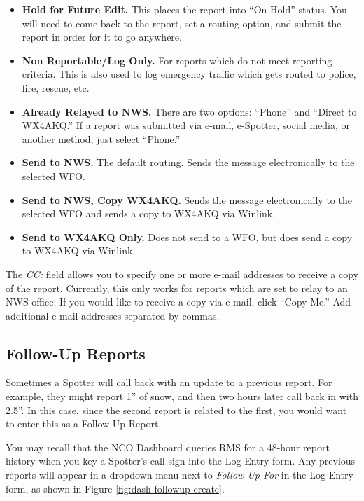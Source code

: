 \documentclass[pdflatex,letterpaper,twoside,12pt]{book}
\begin{document}
\begin{itemize}
\item \textbf{Hold for Future Edit.}  This places the report into ``On Hold'' status.  You will need to come back to the report, set a routing option, and submit the report in order for it to go anywhere.
\item \textbf{Non Reportable/Log Only.}  For reports which do not meet reporting criteria.  This is also used to log emergency traffic which gets routed to police, fire, rescue, etc.
\item \textbf{Already Relayed to NWS.}  There are two options:  ``Phone'' and ``Direct to WX4AKQ.''  If a report was submitted via e-mail, e-Spotter, social media, or another method, just select ``Phone.''
\item \textbf{Send to NWS.}  The default routing.  Sends the message electronically to the selected WFO.
\item \textbf{Send to NWS, Copy WX4AKQ.}  Sends the message electronically to the selected WFO and sends a copy to WX4AKQ via Winlink.
\item \textbf{Send to WX4AKQ Only.}  Does not send to a WFO, but does send a copy to WX4AKQ via Winlink.
\end{itemize}

The \emph{CC:} field allows you to specify one or more e-mail addresses to receive a copy of the report.  Currently, this only works for reports which are set to relay to an NWS office.  If you would like to receive a copy via e-mail, click ``Copy Me.'' Add additional e-mail addresses separated by commas.

\subsection{Follow-Up Reports}\label{follow-up-reports}

Sometimes a Spotter will call back with an update to a previous report.  For example, they might report 1'' of snow, and then two hours later call back in with 2.5''.  In this case, since the second report is related to the first, you would want to enter this as a Follow-Up Report.

You may recall that the NCO Dashboard queries RMS for a 48-hour report history when you key a Spotter's call sign into the Log Entry form.  Any previous reports will appear in a dropdown menu next to \emph{Follow-Up For} in the Log Entry form, as shown in Figure \ref{fig:dash-followup-create}.
\end{document}
